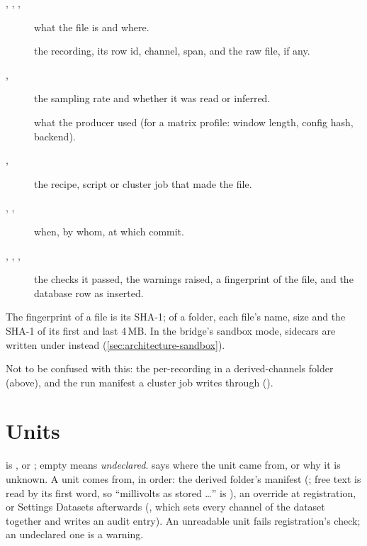 \begin{description}
\item[, , , ] what the file is and where.
\item[] the recording, its row id, channel, span, and the raw file, if any.
\item[, ] the sampling rate and whether it was read or inferred.
\item[] what the producer used (for a matrix profile: window length, config hash,
  backend).
\item[, ] the recipe, script or cluster job that made the file.
\item[, , ] when, by whom, at which commit.
\item[, , , ] the checks it passed, the
  warnings raised, a fingerprint of the file, and the database row as inserted.
\end{description}

The fingerprint of a file is its SHA-1; of a folder, each file's name, size and the SHA-1 of its first
and last 4\,MB. In the bridge's sandbox mode, sidecars are written under
 instead (\cref{sec:architecture-sandbox}).

Not to be confused with this: the per-recording  in a derived-channels folder
(above), and the run manifest a cluster job writes through 
().

\section{Units}\label{sec:data-units}
 is ,  or ; empty means \emph{undeclared}.
 says where the unit came from, or why it is unknown. A unit comes from,
in order: the derived folder's manifest (; free text is read by its first word, so
``millivolts as stored \ldots'' is ), an override at registration, or Settings
\textrightarrow{} Datasets afterwards (, which sets
every channel of the dataset together and writes an audit entry). An unreadable unit fails
registration's  check; an undeclared one is a warning.

